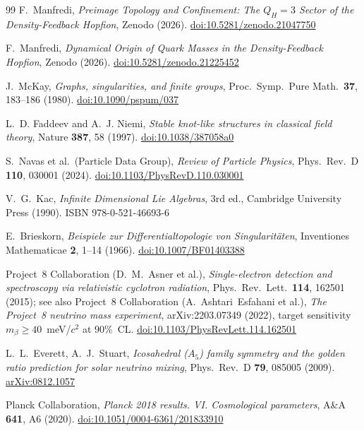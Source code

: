 \documentclass[11pt,a4paper]{article}
\theoremstyle{definition}\newtheorem{definition}[theorem]{Definition}
\theoremstyle{remark}
\begin{document}
\begin{thebibliography}{99}
F.~Manfredi,
\textit{Preimage Topology and Confinement: The $Q_H=3$ Sector of the Density-Feedback Hopfion},
Zenodo (2026).
\href{https://doi.org/10.5281/zenodo.21047750}{doi:10.5281/zenodo.21047750}

F.~Manfredi,
\textit{Dynamical Origin of Quark Masses in the Density-Feedback Hopfion},
Zenodo (2026).
\href{https://doi.org/10.5281/zenodo.21225452}{doi:10.5281/zenodo.21225452}

J.~McKay,
\textit{Graphs, singularities, and finite groups},
Proc.\ Symp.\ Pure Math.\ \textbf{37}, 183--186 (1980).
\href{https://doi.org/10.1090/pspum/037}{doi:10.1090/pspum/037}

L.~D. Faddeev and A.~J. Niemi,
\textit{Stable knot-like structures in classical field theory},
Nature \textbf{387}, 58 (1997).
\href{https://doi.org/10.1038/387058a0}{doi:10.1038/387058a0}

S.~Navas et al.\ (Particle Data Group),
\textit{Review of Particle Physics},
Phys.\ Rev.\ D \textbf{110}, 030001 (2024).
\href{https://doi.org/10.1103/PhysRevD.110.030001}{doi:10.1103/PhysRevD.110.030001}

V.~G.~Kac,
\textit{Infinite Dimensional Lie Algebras}, 3rd ed.,
Cambridge University Press (1990).
ISBN 978-0-521-46693-6

E.~Brieskorn,
\textit{Beispiele zur Differentialtopologie von Singularit\"aten},
Inventiones Mathematicae \textbf{2}, 1--14 (1966).
\href{https://doi.org/10.1007/BF01403388}{doi:10.1007/BF01403388}

Project~8 Collaboration (D.~M.~Asner et al.),
\textit{Single-electron detection and spectroscopy via relativistic
  cyclotron radiation},
Phys.\ Rev.\ Lett.\ \textbf{114}, 162501 (2015);
see also Project~8 Collaboration (A.~Ashtari~Esfahani et al.),
\textit{The Project~8 neutrino mass experiment},
arXiv:2203.07349 (2022), target sensitivity $m_\beta\geq 40$~meV/$c^2$
at $90\%$~CL.
\href{https://doi.org/10.1103/PhysRevLett.114.162501}{doi:10.1103/PhysRevLett.114.162501}

L.~L.~Everett, A.~J.~Stuart,
\textit{Icosahedral ($A_5$) family symmetry and the golden ratio
prediction for solar neutrino mixing},
Phys.\ Rev.\ D \textbf{79}, 085005 (2009).
\href{https://arxiv.org/abs/0812.1057}{arXiv:0812.1057}

Planck Collaboration,
\textit{Planck 2018 results. VI. Cosmological parameters},
A\&A \textbf{641}, A6 (2020).
\href{https://doi.org/10.1051/0004-6361/201833910}{doi:10.1051/0004-6361/201833910}

\end{thebibliography}
\end{document}
